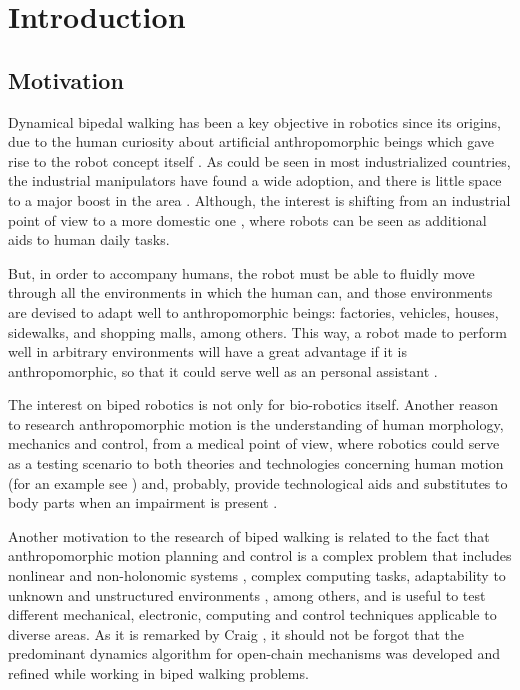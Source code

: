 \chapter{Introduction} \label{ch:intro}
\section{Motivation}
Dynamical bipedal walking has been a key objective in robotics since
its origins, due to the human curiosity about artificial
anthropomorphic beings which gave rise to the robot concept itself
\cite{Capek3R.U.R.}. As could be seen in most industrialized
countries, the industrial manipulators have found a wide adoption, and
there is little space to a major boost in the area
\cite{Yonemoto85TECHNOLOGY}. Although, the interest is shifting from
an industrial point of view to a more domestic one
\cite{Asami94Robots}, where robots can be seen as additional aids to
human daily tasks.

But, in order to accompany humans, the robot must be able to fluidly
move through all the environments in which the human can, and those
environments are devised to adapt well to anthropomorphic beings:
factories, vehicles, houses, sidewalks, and shopping malls, among
others. This way, a robot made to perform well in arbitrary
environments will have a great advantage if it is anthropomorphic, so
that it could serve well as an personal assistant
\cite{Dario01Humanoids}.


The interest on biped robotics is not only for bio-robotics
itself. Another reason to research anthropomorphic motion is the
understanding of human morphology, mechanics and control, from a
medical point of view, where robotics could serve as a testing
scenario to both theories and technologies concerning human motion
(for an example see \cite{Woo06Biomechanics}) and, probably, provide
technological aids and substitutes to body parts when an impairment is
present \cite{Hermini01Proposal}.


Another motivation to the research of biped walking is related to the
fact that anthropomorphic motion planning and control is a complex
problem that includes nonlinear and non-holonomic systems
\cite{Basdogan96Nonlinear}, complex computing tasks, adaptability to
unknown and unstructured environments \cite{Cheng00Dynamic}, among
others, and is useful to test different mechanical, electronic,
computing and control techniques applicable to diverse areas. As it is
remarked by Craig \cite{Craig89Introduction}, it should not be forgot
that the predominant dynamics algorithm for open-chain mechanisms was
developed \cite{Stepanenko6Dynamics} and refined \cite{Orin9Kinematic}
while working in biped walking problems.


